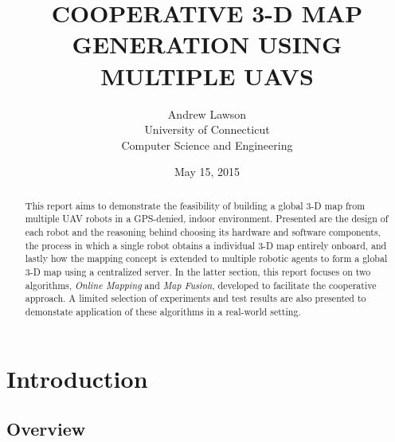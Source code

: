 \documentclass[letterpaper, oneside, 10pt]{report}
\title{\large COOPERATIVE 3-D MAP GENERATION USING MULTIPLE UAVS}
\author{
  \large
  Andrew Lawson \\
  University of Connecticut \\
  Computer Science and Engineering
}
\date{\large May 15, 2015}
\begin{document}
\begin{titlepage}
  \maketitle
  \thispagestyle{empty}
\end{titlepage}
\clearpage

\begin{abstract}

This report aims to demonstrate the feasibility of building a global 3-D map from multiple UAV robots in a GPS-denied, indoor environment. Presented are the design of each robot and the reasoning behind choosing its hardware and software components, the process in which a single robot obtains a individual 3-D map entirely onboard, and lastly how the mapping concept is extended to multiple robotic agents to form a global 3-D map using a centralized server. In the latter section, this report focuses on two algorithms, \textsl{Online Mapping} and \textsl{Map Fusion}, developed to facilitate the cooperative approach. A limited selection of experiments and test results are also presented to demonstate application of these algorithms in a real-world setting.

\end{abstract}
\clearpage


\tableofcontents
\listoffigures
\listoftables
\clearpage

\doublespacing

\chapter{Introduction}

\section{Overview}
\end{document}
